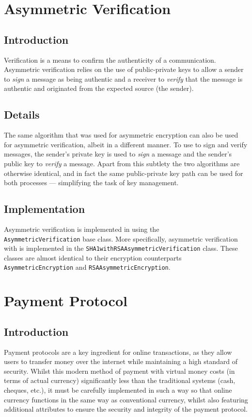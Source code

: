 \documentclass[a4paper,11pt]{article}
\begin{document}
\section{Asymmetric Verification}

\subsection{Introduction}
Verification is a means to confirm the authenticity of a communication. 
Asymmetric verification relies on the use of public-private keys to allow a 
sender to \emph{sign} a message as being authentic and a receiver to
\emph{verify} that the message is authentic and originated from the expected 
source (the sender).

\subsection{Details}
The same  algorithm that was used for asymmetric encryption can 
also be used for asymmetric verification, albeit in a different manner. To use 
 to sign and verify messages, the sender's private key is used 
to \emph{sign} a message and the sender's public key to \emph{verify} a message.
Apart from this subtlety the two algorithms are otherwise identical, and in fact
the same public-private key path can be used for both processes --- simplifying 
the task of key management.

\subsection{Implementation}
Asymmetric verification is implemented in \packageName{} using the \\
\verb+AsymmetricVerification+ base class. More specifically, asymmetric 
verification with  is implemented in the 
\verb+SHA1withRSAAsymmetricVerification+ class. These classes are almost 
identical to their encryption counterparts \verb+AsymmetricEncryption+ and 
\verb+RSAAsymmetricEncryption+.

\section{Payment Protocol}

\subsection{Introduction}
Payment protocols are a key ingredient for online transactions, as they allow 
users to transfer money over the internet while maintaining a high standard of 
security. Whilst this modern method of payment with virtual money costs (in 
terms of actual currency) significantly less than the traditional systems (cash,
cheques, etc.), it must be carefully implemented in such a way so that online 
currency functions in the same way as conventional currency, whilst also 
featuring additional attributes to ensure the security and integrity of the 
payment protocol.
\end{document}
